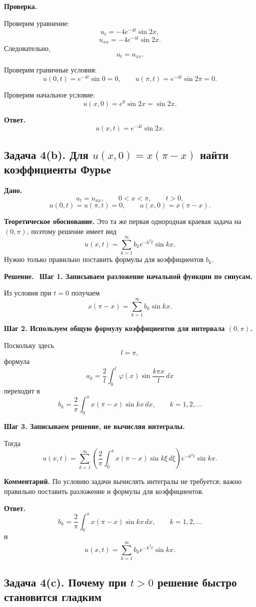 \documentclass[a4paper,12pt]{article}
\newcommand{\Solution}{\textbf{Решение.}\ }
\begin{document}
\textbf{Проверка.}

Проверим уравнение:
\[
u_t=-4e^{-4t}\sin 2x,
\]
\[
u_{xx}=-4e^{-4t}\sin 2x.
\]
Следовательно,
\[
u_t=u_{xx}.
\]

Проверим граничные условия:
\[
u(0,t)=e^{-4t}\sin 0=0,
\qquad
u(\pi,t)=e^{-4t}\sin 2\pi=0.
\]

Проверим начальное условие:
\[
u(x,0)=e^0\sin 2x=\sin 2x.
\]

\textbf{Ответ.}
\[
u(x,t)=e^{-4t}\sin 2x.
\]

\subsection*{Задача 4(b). Для \texorpdfstring{$u(x,0)=x(\pi-x)$}{u(x,0)=x(pi-x)} найти коэффициенты Фурье}

\textbf{Дано.}
\[
u_t=u_{xx},
\qquad
0<x<\pi,
\qquad
t>0,
\]
\[
u(0,t)=u(\pi,t)=0,
\qquad
u(x,0)=x(\pi-x).
\]

\textbf{Теоретическое обоснование.}
Это та же первая однородная краевая задача на $(0,\pi)$, поэтому решение имеет вид
\[
u(x,t)=\sum_{k=1}^{\infty}b_ke^{-k^2t}\sin kx.
\]
Нужно только правильно поставить формулы для коэффициентов $b_k$.

\Solution
\textbf{Шаг 1. Записываем разложение начальной функции по синусам.}

Из условия при $t=0$ получаем
\[
x(\pi-x)=\sum_{k=1}^{\infty}b_k\sin kx.
\]

\textbf{Шаг 2. Используем общую формулу коэффициентов для интервала \texorpdfstring{$(0,\pi)$}{(0,pi)}.}

Поскольку здесь
\[
l=\pi,
\]
формула
\[
a_k=\frac{2}{l}\int_0^l \varphi(x)\sin\frac{k\pi x}{l}\,dx
\]
переходит в
\[
b_k=\frac{2}{\pi}\int_0^{\pi}x(\pi-x)\sin kx\,dx,
\qquad
k=1,2,\dots
\]

\textbf{Шаг 3. Записываем решение, не вычисляя интегралы.}

Тогда
\[
u(x,t)=\sum_{k=1}^{\infty}
\left(
\frac{2}{\pi}\int_0^{\pi}x(\pi-x)\sin k\xi\,d\xi
\right)e^{-k^2t}\sin kx.
\]

\textbf{Комментарий.} По условию задачи вычислять интегралы не требуется; важно правильно поставить разложение и формулы для коэффициентов.

\textbf{Ответ.}
\[
b_k=\frac{2}{\pi}\int_0^{\pi}x(\pi-x)\sin kx\,dx,
\qquad
k=1,2,\dots
\]
и
\[
u(x,t)=\sum_{k=1}^{\infty}b_ke^{-k^2t}\sin kx.
\]

\subsection*{Задача 4(c). Почему при \texorpdfstring{$t>0$}{t>0} решение быстро становится гладким}
\end{document}
